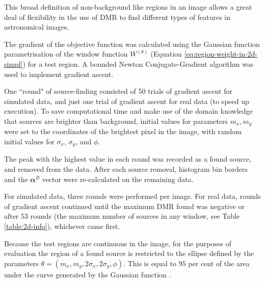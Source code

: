 \documentclass[
    ,final            %
  ]
  {aipproc}
\begin{document}
This broad definition of non-background like regions in an image allows a great deal of flexibility in the use of DMR to find different types of features in astronomical images.

The gradient of the objective function was calculated using the Gaussian function parametrisation of the window function $W^{(\theta)}$ (Equation \ref{eq:region-weight-in-2d-simpl}) for a test region. A bounded Newton Conjugate-Gradient algorithm 
\cite{scipy} was used to implement gradient ascent. 

One ``round" of source-finding consisted of 50 trials of gradient ascent for simulated data, and just one trial of gradient ascent for real data (to speed up execution). To save computational time and make use of the domain knowledge that sources are brighter than background, initial values for parameters $m_x, m_y$ were set to the coordinates of the brightest pixel in the image, with random initial values for $\sigma_x$, $\sigma_y$, and $\phi$.

The peak with the highest value in each round was recorded as a found source, and removed from the data. After each source removal, histogram bin borders and the $\boldsymbol{\alpha}^B$ vector were re-calculated on the remaining data. 

For simulated data, three rounds were performed per image. For real data, rounds of gradient ascent continued until the maximum DMR found was negative
or after $53$ rounds (the maximum number of sources in any window, see Table \ref{table:2d-info}), whichever came first.

Because the test regions are continuous in the image, for the purposes of evaluation the region of a found source is restricted to the ellipse defined by the parameters $\theta = (m_x, m_y, 2\sigma_x, 2\sigma_y, \phi)$. This is equal to $95$ per cent of the area under the curve generated by the Gaussian function \cite{wasserman2004all}.
\end{document}
